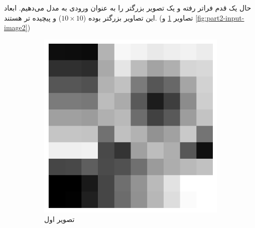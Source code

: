         حال یک قدم فراتر رفته و یک تصویر بزرگتر را به عنوان ورودی به مدل می‌دهیم. ابعاد این تصاویر بزرگتر بوده
        ($10\times 10$) 
        و پیچیده تر هستند. 
        (تصاویر 
        \ref{fig:part2-input-image1} و
        \ref{fig:part2-input-image2})
        \begin{figure}[htbp]
            \centering
            \captionsetup{width=.9\linewidth}
            \begin{subfigure}[b]{0.35\textwidth}
                \centering
                \includegraphics[width=\textwidth]{images/slop-resized.jpg}
                \caption{تصویر اول}
                \label{fig:part2-input-image1}
            \end{subfigure}
            \hfill
            \begin{subfigure}[b]{0.35\textwidth}
                \centering

\end{subfigure}
\end{figure}

